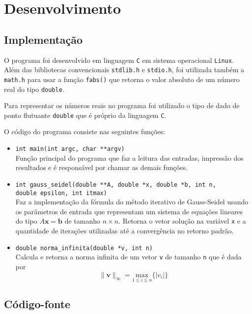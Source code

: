 \section{Desenvolvimento}

\subsection{Implementação}

O programa foi desenvolvido em linguagem \texttt{C} em sistema operacional \texttt{Linux}. Além das bibliotecas convencionais \texttt{stdlib.h} e \texttt{stdio.h}, foi utilizada também a \texttt{math.h} para usar a função \texttt{fabs()} que retorna o valor absoluto de um número real do tipo \texttt{double}.

Para representar os números reais no programa foi utilizado o tipo de dado de ponto flutuante \texttt{double} que é próprio da linguagem \texttt{C}.

O código do programa consiste nas seguintes funções:
\begin{itemize}
	\item \verb|int main(int argc, char **argv)|\\
	Função principal do programa que faz a leitura das entradas, impressão dos resultados e é responsável por chamar as demais funções.
	
	\item \verb|int gauss_seidel(double **A, double *x, double *b, int n,|\\
	\verb|double epsilon, int itmax)|\\
	Faz a implementação da fórmula do método iterativo de Gauss-Seidel usando os parâmetros de entrada que representam um sistema de equações lineares do tipo $A\mathbf{x} = \mathbf{b}$ de tamanho $n \times n$. Retorna o vetor solução na variável \texttt{x} e a quantidade de iterações utilizadas até a convergência no retorno padrão.
	
	\item \verb|double norma_infinita(double *v, int n)|\\
	Calcula e retorna a norma infinita de um vetor \texttt{v} de tamanho \texttt{n} que é dada por
	\[
		\| \mathbf{v} \|_{\infty} = \underset{1 \leq i \leq n}{\text{max}}\{|v_{i}|\}
	\]
\end{itemize}

\subsection{Código-fonte}

